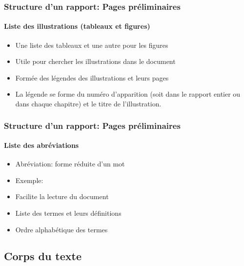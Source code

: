 \documentclass[xcolor=table]{beamer}
\begin{document}
\begin{frame}
\frametitle{Structure d'un rapport: Pages préliminaires}
\framesubtitle{Liste des illustrations (tableaux et figures)}

\begin{minipage}{0.60\textwidth}
	\begin{itemize}
		\item Une liste des tableaux et une autre pour les figures
		\item Utile pour chercher les illustrations dans le document
		\item Formée des légendes des illustrations et leurs pages
		\item La légende se forme du numéro d'apparition (soit dans le rapport entier ou dans chaque chapitre) et le titre de l'illustration.
	\end{itemize}
\end{minipage}
\begin{minipage}{0.38\textwidth}
\end{minipage}

\end{frame}

\begin{frame}
\frametitle{Structure d'un rapport: Pages préliminaires}
\framesubtitle{Liste des abréviations}

\begin{minipage}{0.60\textwidth}
	\begin{itemize}
		\item Abréviation: forme réduite d'un mot
		\item Exemple: 
		\item Facilite la lecture du document 
		\item Liste des termes et leurs définitions
		\item Ordre alphabétique des termes
	\end{itemize}
\end{minipage}
\begin{minipage}{0.38\textwidth}
\end{minipage}

\end{frame}

\subsection{Corps du texte}
\end{document}
